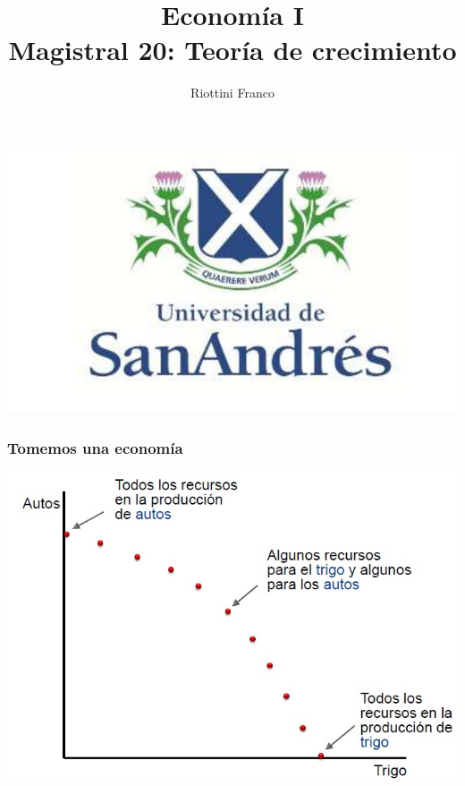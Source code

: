 \documentclass{beamer}
\title[Economía I]{Economía I \vspace{4mm}
\\ Magistral 20: Teoría de crecimiento}
\date{}
\author[Riottini]{Riottini Franco}
\institute[]{Universidad de San Andrés}
\begin{document}
\begin{frame}
\titlepage
\centering

\includegraphics[scale=0.2]{../Figures/logoUDESA.jpg} 
\end{frame}

\begin{frame}
\frametitle{Tomemos una economía}
\begin{center}
    \includegraphics[scale=0.6]{../Tema_11.2_tomemosunaeconomia.jpg}
\end{center}
\end{frame}
\end{document}
